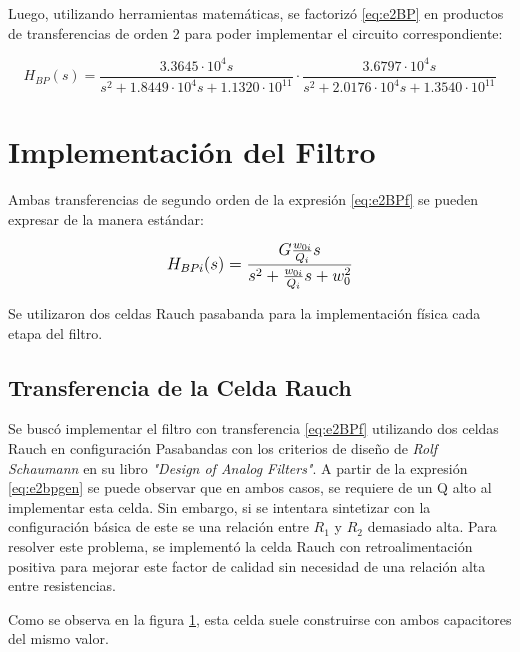 Luego, utilizando herramientas matemáticas, se factorizó \eqref{eq:e2BP} en productos de transferencias de orden 2 para poder implementar el circuito correspondiente:

\begin{equation}
H_{BP}(s)=\frac{3.3645\cdot 10^4s}{s^2 + 1.8449\cdot10^4 s + 1.1320\cdot10^{11}} \cdot \frac{3.6797\cdot 10^4s}{s^2 + 2.0176\cdot10^4 s + 1.3540\cdot10^{11}}
\label{eq:e2BPf}
\end{equation}

\section{Implementación del Filtro}

Ambas transferencias de segundo orden de la expresión \eqref{eq:e2BPf} se pueden expresar de la manera estándar:

\begin{equation}
\mathlarger{
H_{BPi} (s) = \frac{ G \frac{w_{0i}}{Q_i}s }{s^2+ \frac{w_{0i}}{Q_i}s+w_0^2}
}
\label{eq:e2bpgen}
\end{equation}

Se utilizaron dos celdas Rauch pasabanda para la implementación física cada etapa del filtro.

\subsection{Transferencia de la Celda Rauch}

\begin{figure}[ht]
\begin{center}

\label{fig:e2cell}
\end{center}
\end{figure}

Se buscó implementar el filtro con transferencia \eqref{eq:e2BPf} utilizando dos celdas Rauch en configuración Pasabandas con los criterios de diseño de \textit{Rolf Schaumann} en su libro \textit{"Design of Analog Filters"}. A partir de la expresión \eqref{eq:e2bpgen} se puede observar que en ambos casos, se requiere de un Q alto al implementar esta celda. Sin embargo, si se intentara sintetizar con la configuración básica de este se una relación entre $R_1$ y $R_2$ demasiado alta. Para resolver este problema, se implementó la celda Rauch con retroalimentación positiva para mejorar este factor de calidad sin necesidad de una relación alta entre resistencias.

Como se observa en la figura \ref{fig:e2cell}, esta celda suele construirse con ambos capacitores del mismo valor.

